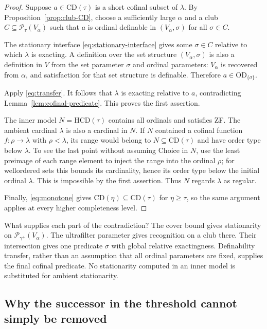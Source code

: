 \documentclass[11pt,letterpaper]{article}
\theoremstyle{definition}
\newcommand{\OD}{\mathrm{OD}}
\newcommand{\CD}{\mathrm{CD}}
\newcommand{\HCD}{\mathrm{HCD}}
\newcommand{\PP}{\mathcal P}
\begin{document}
\begin{proof}
Suppose $a\in\CD(\tau)$ is a short cofinal subset of $\lambda$. By Proposition~\ref{prop:club-CD}, choose a sufficiently large $\alpha$ and a club $C\subseteq\PP_\tau(V_\alpha)$ such that $a$ is ordinal definable in $(V_\alpha,\sigma)$ for all $\sigma\in C$.

The stationary interface \eqref{eq:stationary-interface} gives some $\sigma\in C$ relative to which $\lambda$ is exacting. A definition over the set structure $(V_\alpha,\sigma)$ is also a definition in $V$ from the set parameter $\sigma$ and ordinal parameters: $V_\alpha$ is recovered from $\alpha$, and satisfaction for that set structure is definable. Therefore $a\in\OD_{\{\sigma\}}$.

Apply \eqref{eq:transfer}. It follows that $\lambda$ is exacting relative to $a$, contradicting Lemma~\ref{lem:cofinal-predicate}. This proves the first assertion.

The inner model $N=\HCD(\tau)$ contains all ordinals and satisfies ZF. The ambient cardinal $\lambda$ is also a cardinal in $N$. If $N$ contained a cofinal function $f:\rho\to\lambda$ with $\rho<\lambda$, its range would belong to $N\subseteq\CD(\tau)$ and have order type below $\lambda$. To see the last point without assuming Choice in $N$, use the least preimage of each range element to inject the range into the ordinal $\rho$; for wellordered sets this bounds its cardinality, hence its order type below the initial ordinal $\lambda$. This is impossible by the first assertion. Thus $N$ regards $\lambda$ as regular.

Finally, \eqref{eq:monotone} gives $\CD(\eta)\subseteq\CD(\tau)$ for $\eta\geq\tau$, so the same argument applies at every higher completeness level.
\end{proof}

\begin{assessment}{What supplies each part of the contradiction?}
The cover bound gives stationarity on $\PP_{\gamma^+}(V_\alpha)$. The ultrafilter parameter gives recognition on a club there. Their intersection gives one predicate $\sigma$ with global relative exactingness. Definability transfer, rather than an assumption that all ordinal parameters are fixed, supplies the final cofinal predicate. No stationarity computed in an inner model is substituted for ambient stationarity.
\end{assessment}

\subsection{Why the successor in the threshold cannot simply be removed}
\end{document}
